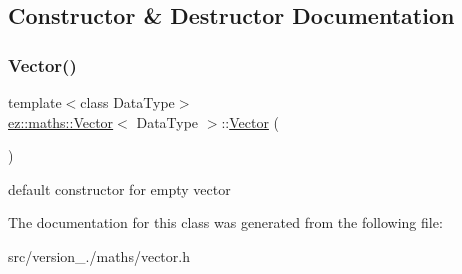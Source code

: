 \subsection{Constructor \& Destructor Documentation}
\mbox{\label{classez_1_1maths_1_1Vector_a91c04bdb0e9cdba97affc0c2918e2c34}} 
\subsubsection{\texorpdfstring{Vector()}{Vector()}}
{\footnotesize\ttfamily template$<$class Data\+Type$>$ \\
\hyperlink{classez_1_1maths_1_1Vector}{ez\+::maths\+::\+Vector}$<$ Data\+Type $>$\+::\hyperlink{classez_1_1maths_1_1Vector}{Vector} (\begin{DoxyParamCaption}{ }\end{DoxyParamCaption})\hspace{0.3cm}{\ttfamily [inline]}}

default constructor for empty vector 

The documentation for this class was generated from the following file\+:\begin{DoxyCompactItemize}
\item 
src/version\+\_./maths/vector.\+h\end{DoxyCompactItemize}
